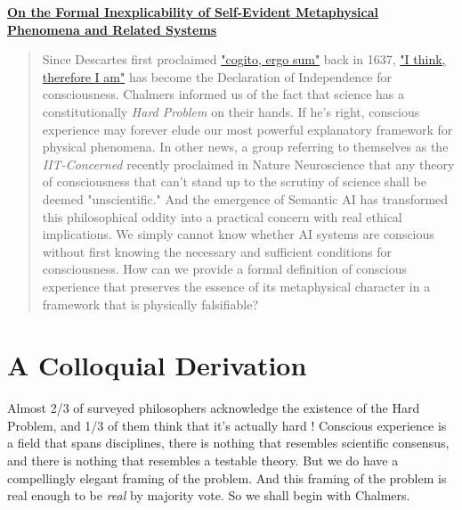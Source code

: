 \documentclass[runningheads]{llncs}
\newcommand{\lib}[2]{\href{https://dna-platform.github.io/inexplicable-phenomena#1}{#2}\xspace}
\begin{document}
\begin{center}
    {\Large\bfseries\boldmath
        \lib{/articles/inexplicable-phenomena/inexplicable-phenomena.html}{On the Formal Inexplicability of Self-Evident Metaphysical Phenomena and Related Systems}
        \par}
    \vskip 0.8cm
\end{center}

\begin{abstract}
Since Descartes first proclaimed \lib{/encyclopedia/cogito-ergo-sum.html}{"cogito, ergo sum"} back in 1637, \lib{/encyclopedia/cogito-ergo-sum.html}{"I think, therefore I am"} has become the Declaration of Independence for consciousness. Chalmers informed us of the fact that science has a constitutionally \emph{Hard Problem} on their hands. If he's right, conscious experience may forever elude our most powerful explanatory framework for physical phenomena. In other news, a group referring to themselves as the \emph{IIT-Concerned} recently proclaimed in Nature Neuroscience that any theory of consciousness that can't stand up to the scrutiny of science shall be deemed "unscientific." And the emergence of Semantic AI has transformed this philosophical oddity into a practical concern with real ethical implications. We simply cannot know whether AI systems are conscious without first knowing the necessary and sufficient conditions for consciousness. How can we provide a formal definition of conscious experience that preserves the essence of its metaphysical character in a framework that is physically falsifiable?

\end{abstract}

\section{A Colloquial Derivation}

Almost 2/3 of surveyed philosophers acknowledge the existence of the Hard Problem, and 1/3 of them think that it's actually hard \cite{BourgetChalmers2023}! Conscious experience is a field that spans disciplines, there is nothing that resembles scientific consensus, and there is nothing that resembles a testable theory. But we do have a compellingly elegant framing of the problem. And this framing of the problem is real enough to be \emph{real} by majority vote. So we shall begin with Chalmers.
\end{document}
